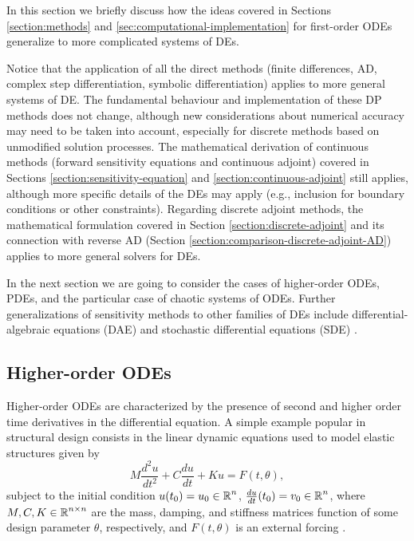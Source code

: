 In this section we briefly discuss how the ideas covered in Sections \ref{section:methods} and \ref{sec:computational-implementation} for first-order ODEs generalize to more complicated systems of DEs. 

Notice that the application of all the direct methods (finite differences, AD, complex step differentiation, symbolic differentiation) applies to more general systems of DE.
The fundamental behaviour and implementation of these DP methods does not change, although new considerations about numerical accuracy may need to be taken into account, especially for discrete methods based on unmodified solution processes.  
The mathematical derivation of continuous methods (forward sensitivity equations and continuous adjoint) covered in Sections \ref{section:sensitivity-equation} and \ref{section:continuous-adjoint} still applies, although more specific details of the DEs may apply (e.g., inclusion for boundary conditions or other constraints). 
Regarding discrete adjoint methods, the mathematical formulation covered in Section \ref{section:discrete-adjoint} and its connection with reverse AD (Section \ref{section:comparison-discrete-adjoint-AD}) applies to more general solvers for DEs. 

In the next section we are going to consider the cases of higher-order ODEs, PDEs, and the particular case of chaotic systems of ODEs. 
Further generalizations of sensitivity methods to other families of DEs include differential-algebraic equations (DAE) \cite{Cao_Li_Petzold_2002} and stochastic differential equations (SDE) \cite{li2020scalable}. 

\subsection{Higher-order ODEs}

Higher-order ODEs are characterized by the presence of second and higher order time derivatives in the differential equation. 
A simple example popular in structural design consists in the linear dynamic equations used to model elastic structures given by 
\begin{equation}
    M \frac{d^2 u}{dt^2}
    +
    C \frac{du}{dt}
    + 
    K u
    = 
    F(t, \theta),
\end{equation}
subject to the initial condition $u(t_0) = u_0 \in \operatorname{\mathbb{R}}^n$, $\frac{du}{dt}(t_0) = v_0 \in \operatorname{\mathbb{R}}^n$, where $M, C, K \in \operatorname{\mathbb{R}}^{n \times n}$ are the mass, damping, and stiffness matrices function of some design parameter $\theta$, respectively, and $F(t, \theta)$ is an external forcing \cite{min1999optimal, Jensen_Nakshatrala_Tortorelli_2014}.  

